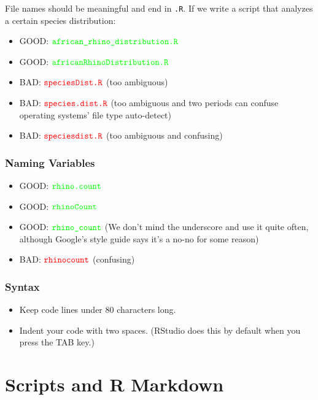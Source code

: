 \documentclass[]{krantz}
\providecommand{\tightlist}{%
  \setlength{\itemsep}{0pt}\setlength{\parskip}{0pt}}
\begin{document}
File names should be meaningful and end in \texttt{.R}. If we write a script that analyzes a certain species distribution:

\begin{itemize}
\tightlist
\item
  GOOD: \(\color{green}{\verb+african_rhino_distribution.R+}\)
\item
  GOOD: \(\color{green}{\verb+africanRhinoDistribution.R+}\)
\item
  BAD: \(\color{red}{\verb+speciesDist.R+}\) (too ambiguous)
\item
  BAD: \(\color{red}{\verb+species.dist.R+}\) (too ambiguous and two periods can confuse operating systems' file type auto-detect)
\item
  BAD: \(\color{red}{\verb+speciesdist.R+}\) (too ambiguous and confusing)
\end{itemize}

\hypertarget{naming-variables}{%
\subsection{Naming Variables}\label{naming-variables}}

\begin{itemize}
\tightlist
\item
  GOOD: \(\color{green}{\verb+rhino.count+}\)
\item
  GOOD: \(\color{green}{\verb+rhinoCount+}\)
\item
  GOOD: \(\color{green}{\verb+rhino_count+}\) (We don't mind the underscore and use it quite often, although Google's style guide says it's a no-no for some reason)
\item
  BAD: \(\color{red}{\verb+rhinocount+}\) (confusing)
\end{itemize}

\hypertarget{syntax}{%
\subsection{Syntax}\label{syntax}}

\begin{itemize}
\tightlist
\item
  Keep code lines under 80 characters long.
\item
  Indent your code with two spaces. (RStudio does this by default when you press the TAB key.)
\end{itemize}

\hypertarget{scripts-and-r-markdown}{%
\chapter{Scripts and R Markdown}\label{scripts-and-r-markdown}}
\end{document}
